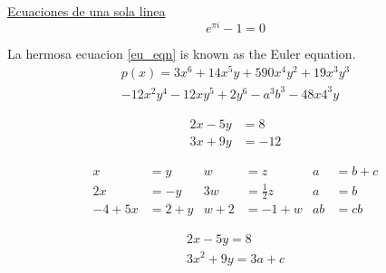 \documentclass[]{article} %
\begin{document}
        \underline{Ecuaciones de una sola linea}
        \begin{equation} \label{eu_eqn}
            e^{\pi i} - 1 = 0
        \end{equation}

        La hermosa ecuacion \ref{eu_eqn} is known as the Euler equation.\\

        
        \begin{multline*}
            p(x) = 3x^6 + 14x^5y + 590x^4y^2 + 19x^3y^3\\
            -12x^2y^4 - 12xy^5 + 2y^6 - a^3b^3 - 48x4^3y
        \end{multline*}


        \begin{align*} 
            2x - 5y &=  8 \\ 
            3x + 9y &=  -12
        \end{align*}


        \begin{align*}
            x&=y           &  w &=z              &  a&=b+c\\
            2x&=-y         &  3w&=\frac{1}{2}z   &  a&=b\\
            -4 + 5x&=2+y   &  w+2&=-1+w          &  ab&=cb
            \end{align*}


        \begin{gather*} 
            2x - 5y =  8 \\ 
            3x^2 + 9y =  3a + c
        \end{gather*}
        
\end{document}
